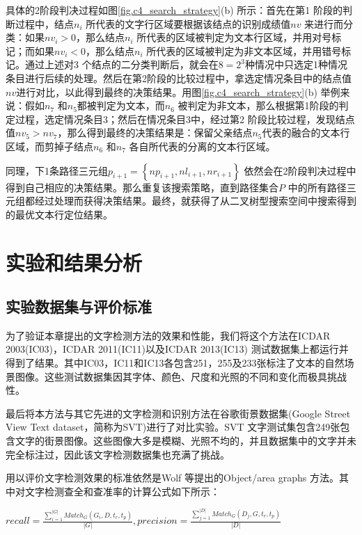         具体的2阶段判决过程如图\ref{fig.c4_search_strategy}(b) 所示：首先在第1 阶段的判断过程中，结点$n_i$ 所代表的文字行区域要根据该结点的识别成绩值$nv$ 来进行而分类：如果$nv_i>0$，那么结点$n_i$ 所代表的区域被判定为文本行区域，并用对号标记；而如果$nv_i<0$，那么结点$n_i$ 所代表的区域被判定为非文本区域，并用错号标记。通过上述对3 个结点的二分类判断后，就会在$8=2^3$种情况中只选定1种情况条目进行后续的处理。然后在第2阶段的比较过程中，拿选定情况条目中的结点值$nv$进行对比，以此得到最终的决策结果。用图\ref{fig.c4_search_strategy}(b) 举例来说：假如$n_7$ 和$n_5$都被判定为文本，而$n_6$ 被判定为非文本，那么根据第1阶段的判定过程，选定情况条目3；然后在情况条目3中，经过第2 阶段比较过程，发现结点值$nv_5>nv_7$，那么得到最终的决策结果是：保留父亲结点$n_5$代表的融合的文本行区域，而剪掉子结点$n_6$ 和$n_7$ 各自所代表的分离的文本行区域。

        同理，下1条路径三元组$p_{i+1}=\left\{np_{i+1},nl_{i+1},nr_{i+1}\right\}$ 依然会在2阶段判决过程中得到自己相应的决策结果。那么重复该搜索策略，直到路径集合$P$ 中的所有路径三元组都经过处理而获得决策结果。最终，就获得了从二叉树型搜索空间中搜索得到的最优文本行定位结果。

    \section{实验和结果分析}

        \subsection{实验数据集与评价标准}

        为了验证本章提出的文字检测方法的效果和性能，我们将这个方法在ICDAR 2003(IC03)，ICDAR 2011(IC11)以及ICDAR 2013(IC13) 测试数据集上都运行并得到了结果。其中IC03，IC11和IC13各包含251，255及233张标注了文本的自然场景图像。这些测试数据集因其字体、颜色、尺度和光照的不同和变化而极具挑战性。

        最后将本方法与其它先进的文字检测和识别方法在谷歌街景数据集(Google Street View Text dataset，简称为SVT)进行了对比实验。SVT 文字测试集包含249张包含文字的街景图像。这些图像大多是模糊、光照不均的，并且数据集中的文字并未完全标注过，因此该文字检测数据集也充满了挑战。

        用以评价文字检测效果的标准依然是Wolf 等\cite{Wolf2006Object}提出的Object/area graphs 方法。其中对文字检测查全和查准率的计算公式如下所示：

        $recall = \frac {\sum_{i=1}^{|G|}Match_G(G_i,D,t_r,t_p)} {|G|}  ,   precision =\frac {\sum_{j=1}^{|D|}Match_G(D_j,G,t_r,t_p)} {|D|}$


